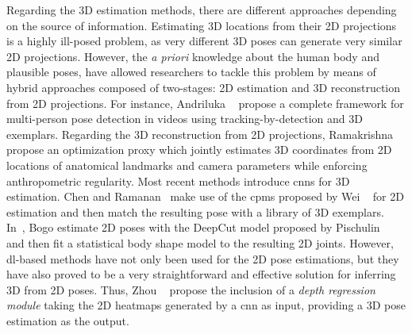 Regarding the 3D estimation methods, there are different approaches depending on the source of information. Estimating 3D locations from their 2D projections is a highly ill-posed problem, as very different 3D poses can generate very similar 2D projections. However, the \textit{a priori} knowledge about the human body and plausible poses, have allowed researchers to tackle this problem by means of hybrid approaches composed of two-stages: 2D estimation and 3D reconstruction from 2D projections. For instance, Andriluka \etal~\cite{Andriluka2010-oc} propose a complete framework for multi-person pose detection in videos using tracking-by-detection and 3D exemplars. Regarding the 3D reconstruction from 2D projections, Ramakrishna \etal~\cite{Ramakrishna2012-ti} propose an optimization proxy which jointly estimates 3D coordinates from 2D locations of anatomical landmarks and camera parameters while enforcing anthropometric regularity. Most recent methods introduce \glspl{cnn} for 3D estimation. Chen and Ramanan~\cite{Chen2017-ug} make use of the \glspl{cpm} proposed by Wei \etal~\cite{Wei2016-rb} for 2D estimation and then match the resulting pose with a library of 3D exemplars. In~\cite{Bogo2016-kk}, Bogo \etal estimate 2D poses with the DeepCut model proposed by Pischulin \etal~\cite{Pishchulin2013-zi} and then fit a statistical body shape model to the resulting 2D joints. However, \gls{dl}-based methods have not only been used for the 2D pose estimations, but they have also proved to be a very straightforward and effective solution for inferring 3D from 2D poses. Thus, Zhou \etal~\cite{Zhang2015-js} propose the inclusion of a \textit{depth regression module} taking the 2D heatmaps generated by a \gls{cnn} as input, providing a 3D pose estimation as the output. %

